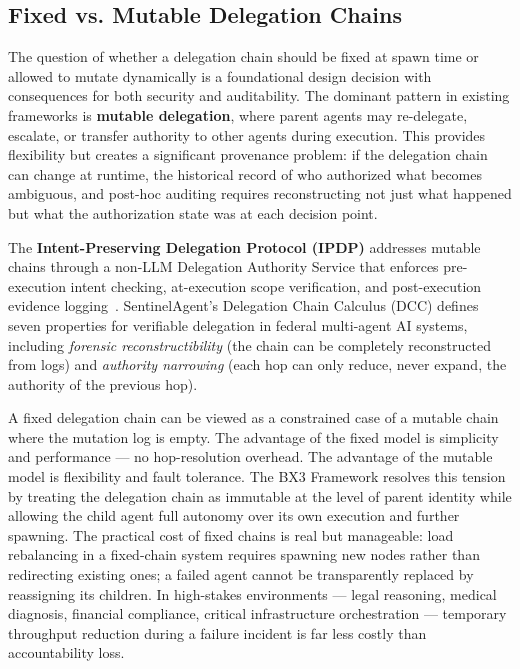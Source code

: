 \subsection{Fixed vs. Mutable Delegation Chains}
\label{sec:delegation}

The question of whether a delegation chain should be fixed at spawn time or allowed to mutate dynamically is a foundational design decision with consequences for both security and auditability. The dominant pattern in existing frameworks is \textbf{mutable delegation}, where parent agents may re-delegate, escalate, or transfer authority to other agents during execution. This provides flexibility but creates a significant provenance problem: if the delegation chain can change at runtime, the historical record of who authorized what becomes ambiguous, and post-hoc auditing requires reconstructing not just what happened but what the authorization state was at each decision point.

The \textbf{Intent-Preserving Delegation Protocol (IPDP)} addresses mutable chains through a non-LLM Delegation Authority Service that enforces pre-execution intent checking, at-execution scope verification, and post-execution evidence logging~\cite{sentinelagent2025}. SentinelAgent's Delegation Chain Calculus (DCC) defines seven properties for verifiable delegation in federal multi-agent AI systems, including \textit{forensic reconstructibility} (the chain can be completely reconstructed from logs) and \textit{authority narrowing} (each hop can only reduce, never expand, the authority of the previous hop).

A fixed delegation chain can be viewed as a constrained case of a mutable chain where the mutation log is empty. The advantage of the fixed model is simplicity and performance — no hop-resolution overhead. The advantage of the mutable model is flexibility and fault tolerance. The BX3 Framework resolves this tension by treating the delegation chain as immutable at the level of parent identity while allowing the child agent full autonomy over its own execution and further spawning. The practical cost of fixed chains is real but manageable: load rebalancing in a fixed-chain system requires spawning new nodes rather than redirecting existing ones; a failed agent cannot be transparently replaced by reassigning its children. In high-stakes environments — legal reasoning, medical diagnosis, financial compliance, critical infrastructure orchestration — temporary throughput reduction during a failure incident is far less costly than accountability loss.

